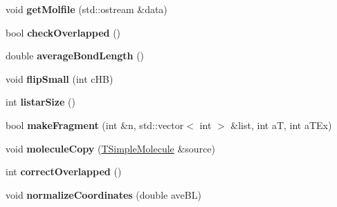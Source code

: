 \begin{DoxyCompactItemize}
\item 
\hypertarget{class_open_babel_1_1_t_simple_molecule_a10b5ea334629c9de0372f55008ba6b61}{void {\bfseries get\-Molfile} (std\-::ostream \&data)}\label{class_open_babel_1_1_t_simple_molecule_a10b5ea334629c9de0372f55008ba6b61}

\item 
\hypertarget{class_open_babel_1_1_t_simple_molecule_ac9fcb4d9ac54415e23051e243438a300}{bool {\bfseries check\-Overlapped} ()}\label{class_open_babel_1_1_t_simple_molecule_ac9fcb4d9ac54415e23051e243438a300}

\item 
\hypertarget{class_open_babel_1_1_t_simple_molecule_a7103575f412d99054b02ab7487bf4def}{double {\bfseries average\-Bond\-Length} ()}\label{class_open_babel_1_1_t_simple_molecule_a7103575f412d99054b02ab7487bf4def}

\item 
\hypertarget{class_open_babel_1_1_t_simple_molecule_a035171f95aee4fb8ece1ad7981b272ef}{void {\bfseries flip\-Small} (int c\-H\-B)}\label{class_open_babel_1_1_t_simple_molecule_a035171f95aee4fb8ece1ad7981b272ef}

\item 
\hypertarget{class_open_babel_1_1_t_simple_molecule_a202a25a75ef32f4abd9003e5bfc388ea}{int {\bfseries listar\-Size} ()}\label{class_open_babel_1_1_t_simple_molecule_a202a25a75ef32f4abd9003e5bfc388ea}

\item 
\hypertarget{class_open_babel_1_1_t_simple_molecule_a6f967f94951d5c24953ca94382a6cf2d}{bool {\bfseries make\-Fragment} (int \&n, std\-::vector$<$ int $>$ \&list, int a\-T, int a\-T\-Ex)}\label{class_open_babel_1_1_t_simple_molecule_a6f967f94951d5c24953ca94382a6cf2d}

\item 
\hypertarget{class_open_babel_1_1_t_simple_molecule_a13e0ecc3a8d1976a33303d7e4535b651}{void {\bfseries molecule\-Copy} (\hyperlink{class_open_babel_1_1_t_simple_molecule}{T\-Simple\-Molecule} \&source)}\label{class_open_babel_1_1_t_simple_molecule_a13e0ecc3a8d1976a33303d7e4535b651}

\item 
\hypertarget{class_open_babel_1_1_t_simple_molecule_a34d5a91eac6ce75e8a509be470c2c834}{int {\bfseries correct\-Overlapped} ()}\label{class_open_babel_1_1_t_simple_molecule_a34d5a91eac6ce75e8a509be470c2c834}

\item 
\hypertarget{class_open_babel_1_1_t_simple_molecule_a6e687faa9e1c13c1f46157a2ad5ecade}{void {\bfseries normalize\-Coordinates} (double ave\-B\-L)}\label{class_open_babel_1_1_t_simple_molecule_a6e687faa9e1c13c1f46157a2ad5ecade}


\end{DoxyCompactItemize}
